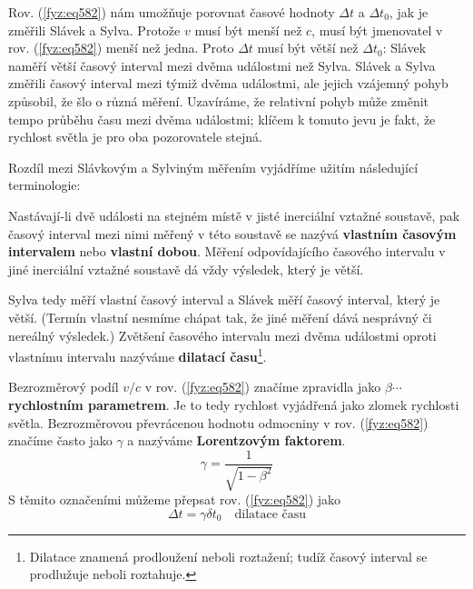     Rov. (\ref{fyz:eq582}) nám umožňuje porovnat časové hodnoty \(\Delta t\) a \(\Delta t_0\), jak
    je změřili Slávek a Sylva. Protože \(v\) musí být menší než \(c\), musí být jmenovatel v rov.
    (\ref{fyz:eq582}) menší než jedna. Proto  \(\Delta t\) musí být větší než  \(\Delta t_0\):
    Slávek naměří větší časový interval mezi dvěma událostmi než Sylva. Slávek a Sylva změřili
    časový interval mezi týmiž dvěma událostmi, ale jejich vzájemný pohyb způsobil, že šlo o různá
    měření. Uzavíráme, že relativní pohyb může změnit tempo průběhu času mezi dvěma událostmi;
    klíčem k tomuto jevu je fakt, že rychlost světla je pro oba pozorovatele stejná.

    Rozdíl mezi Slávkovým a Sylviným měřením vyjádříme užitím následující terminologie:
    \begin{mdframed}[style=mdmathdef] Nastávají-li dvě události na stejném místě v jisté inerciální
      vztažné soustavě, pak časový interval mezi nimi měřený v této soustavě se nazývá
      \textbf{vlastním časovým intervalem} nebo \textbf{vlastní dobou}. Měření odpovídajícího
      časového intervalu v jiné inerciální vztažné soustavě dá vždy výsledek, který je větší.
    \end{mdframed}

    Sylva tedy měří vlastní časový interval a Slávek měří časový interval, který je větší. (Termín
    vlastní nesmíme chápat tak, že jiné měření dává nesprávný či nereálný výsledek.) Zvětšení
    časového intervalu mezi dvěma událostmi oproti vlastnímu intervalu nazýváme \textbf{dilatací
    času}\footnote{Dilatace znamená prodloužení neboli roztažení; tudíž časový interval se
    prodlužuje neboli roztahuje.}.

    Bezrozměrový podíl \(v/c\) v rov. (\ref{fyz:eq582}) značíme zpravidla jako \(\beta\cdots\)
    \textbf{rychlostním parametrem}. Je to tedy rychlost vyjádřená jako zlomek rychlosti světla.
    Bezrozměrovou převrácenou hodnotu odmocniny v rov. (\ref{fyz:eq582}) značíme často jako
    \(\gamma\) a nazýváme \textbf{Lorentzovým faktorem}.
    \begin{equation}\label{fyz:eq583}
      \boxed{\gamma = \dfrac{1}{\sqrt{1-\beta^2}}}
    \end{equation}
    S těmito označeními můžeme přepsat rov. (\ref{fyz:eq582}) jako
    \begin{equation}\label{fyz:eq584}
      \boxed{\Delta t = \gamma \delta t_0} \quad\text{dilatace času}
    \end{equation}

